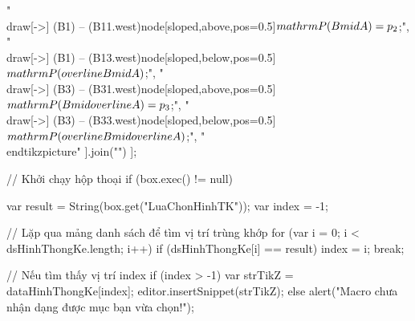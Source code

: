 "\t\\draw[->] (B1) -- (B11.west)node[sloped,above,pos=0.5]{$\\mathrm{P}(B\\mid A)=p_2$};",
"\t\\draw[->] (B1) -- (B13.west)node[sloped,below,pos=0.5]{$\\mathrm{P}(\\overline{B}\\mid A)$};",
"\t\\draw[->] (B3) -- (B31.west)node[sloped,above,pos=0.5]{$\\mathrm{P}(B\\mid\\overline{A})=p_3$};",
"\t\\draw[->] (B3) -- (B33.west)node[sloped,below,pos=0.5]{$\\mathrm{P}(\\overline{B}\\mid\\overline{A})$};",
"\\end{tikzpicture}"
].join("\n")
];

// Khởi chạy hộp thoại
if (box.exec() != null) {
	var result = String(box.get("LuaChonHinhTK"));
	var index = -1;
	
	// Lặp qua mảng danh sách để tìm vị trí trùng khớp
	for (var i = 0; i < dsHinhThongKe.length; i++) {
		if (dsHinhThongKe[i] == result) {
			index = i;
			break;
		}
	}
	
	// Nếu tìm thấy vị trí index
	if (index > -1) {
		var strTikZ = dataHinhThongKe[index];
		editor.insertSnippet(strTikZ);
	} else {
		alert("Macro chưa nhận dạng được mục bạn vừa chọn!");
	}
}
